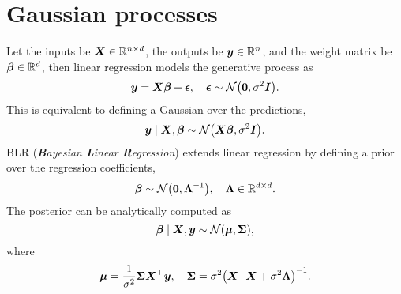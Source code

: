 \section{Gaussian processes}

Let the inputs be $\bm{X} \in \mathbb{R}^{n \times d}$, the outputs be $\bm{y} \in \mathbb{R}^n$, and the weight
matrix be $\bm{\beta} \in \mathbb{R}^d$, then linear regression models the generative process as \[
    \vec{y} = \mat{X} \vec{\beta} + \vec{\epsilon}, \quad \vec{\epsilon} \sim \mathcal{N} \lft( \vec{0}, \sigma^2 \mat{I} \rgt).
\]
This is equivalent to defining a Gaussian over the predictions, \[
    \vec{y} \mid \mat{X}, \vec{\beta} \sim \mathcal{N} \lft( \mat{X} \vec{\beta}, \sigma^2 \mat{I} \rgt).
\]
BLR (\textit{\textbf{B}ayesian \textbf{L}inear \textbf{R}egression}) extends linear regression by
defining a prior over the regression coefficients, \[
    \vec{\beta} \sim \mathcal{N} \lft( \vec{0}, \inv{\mat{\Lambda}} \rgt), \quad \mat{\Lambda} \in \R^{d \times d}.
\]
The posterior can be analytically computed as \[
    \vec{\beta} \mid \mat{X}, \vec{y} \sim \mathcal{N}\lft( \vec{\mu}, \mat{\Sigma} \rgt),
\]
where \[
    \vec{\mu} = \frac{1}{\sigma^2} \mat{\Sigma} \transpose{\mat{X}} \vec{y}, \quad \mat{\Sigma} = \sigma^2 \inv{\lft( \transpose{\mat{X}} \mat{X} + \sigma^2 \mat{\Lambda} \rgt)}.
\]

